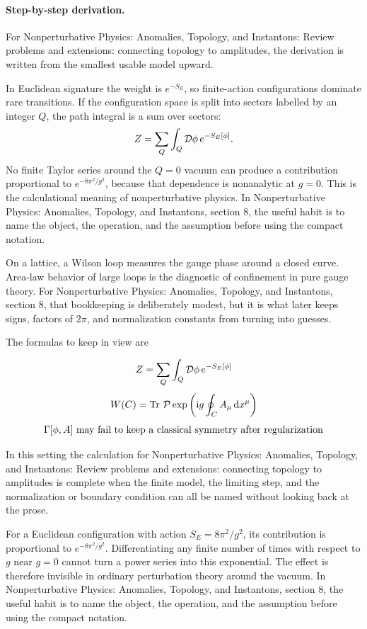 \paragraph{Step-by-step derivation.}

For Nonperturbative Physics: Anomalies, Topology, and Instantons: Review problems and extensions: connecting topology to amplitudes, the derivation is written from the smallest usable model upward.

In Euclidean signature the weight is \(e^{-S_E}\), so finite-action configurations dominate rare transitions.  If the configuration space is split into sectors labelled by an integer \(Q\), the path integral is a sum over sectors:
\[
  Z=\sum_Q\int_Q\mathcal D\phi\,e^{-S_E[\phi]}.
\]
No finite Taylor series around the \(Q=0\) vacuum can produce a contribution proportional to \(e^{-8\pi^2/g^2}\), because that dependence is nonanalytic at \(g=0\).  This is the calculational meaning of nonperturbative physics.  In Nonperturbative Physics: Anomalies, Topology, and Instantons, section 8, the useful habit is to name the object, the operation, and the assumption before using the compact notation.

On a lattice, a Wilson loop measures the gauge phase around a closed curve.  Area-law behavior of large loops is the diagnostic of confinement in pure gauge theory.  For Nonperturbative Physics: Anomalies, Topology, and Instantons, section 8, that bookkeeping is deliberately modest, but it is what later keeps signs, factors of \(2\pi\), and normalization constants from turning into guesses.

The formulas to keep in view are

\[
  Z=\sum_Q\int_Q\mathcal D\phi\,e^{-S_E[\phi]}
\]
\[
  W(C)=\operatorname{Tr}\,\mathcal P\exp\left(\mathrm i g\oint_C A_\mu\,\mathrm d x^\mu\right)
\]
\[
  \Gamma[\phi,A]\hbox{ may fail to keep a classical symmetry after regularization}
\]

In this setting the calculation for Nonperturbative Physics: Anomalies, Topology, and Instantons: Review problems and extensions: connecting topology to amplitudes is complete when the finite model, the limiting step, and the normalization or boundary condition can all be named without looking back at the prose.




\begin{example}
For a Euclidean configuration with action \(S_E=8\pi^2/g^2\), its contribution is proportional to \(e^{-8\pi^2/g^2}\).  Differentiating any finite number of times with respect to \(g\) near \(g=0\) cannot turn a power series into this exponential.  The effect is therefore invisible in ordinary perturbation theory around the vacuum.  In Nonperturbative Physics: Anomalies, Topology, and Instantons, section 8, the useful habit is to name the object, the operation, and the assumption before using the compact notation.
\end{example}



